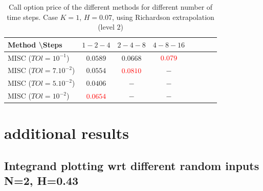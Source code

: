 \documentclass[11pt]{article}
\begin{document}
\begin{table}[h!]
	\centering
	\begin{tabular}{l*{6}{c}r}
		Method \textbackslash  Steps    &$1-2-4$         & $2-4-8$ & $4-8-16$ \\
		\hline
		MISC ($TOl=10^{-1}$)  &$0.0589$ & $0.0668$ & ${\color{red}0.079}$   \\
		MISC ($TOl=7.10^{-2}$)   &$0.0554$ & ${\color{red}0.0810}$ & $-$   \\
		MISC ($TOl=5.10^{-2}$)   &$0.0406$ & $-$ & $-$   \\
		MISC ($TOl=10^{-2}$)  &${\color{red}0.0654}$ & $-$ & $-$   \\	
		\hline
	\end{tabular}
	\caption{ Call option price of the different methods for different number of time steps. Case $K=1$, $H=0.07$, using Richardson extrapolation (level $2$)}
	\label{table: Call option price of the different methods for different number of time steps. Case $K=1$, $H=0.07$, using Richardson extrapolation_level2}
\end{table}






\newpage
\section{additional results}
\subsection{Integrand plotting wrt different random inputs N=2, H=0.43}\label{Appendix:Integrand plotting wrt different random inputs N=2, H=0.43}
\end{document}
